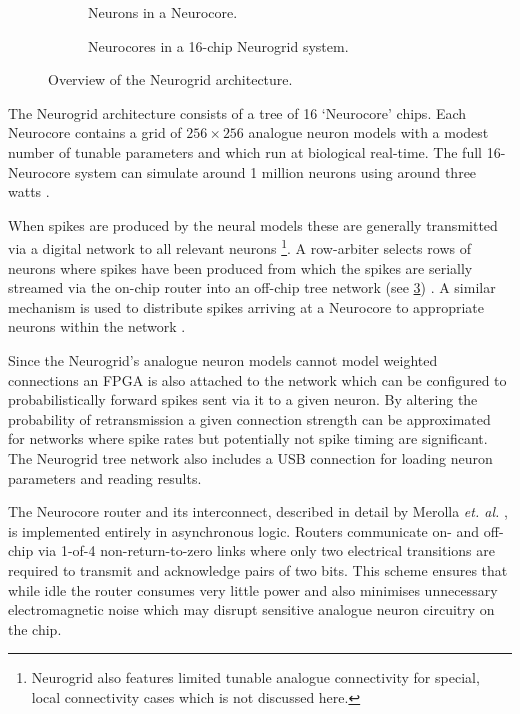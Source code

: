 				\begin{figure}
					\begin{subfigure}[b]{0.39\textwidth}
						\center
						
						\caption{Neurons in a Neurocore.}
						\label{fig:neurogrid-chip}
					\end{subfigure}
					\begin{subfigure}[b]{0.59\textwidth}
						\center
						
						\caption{Neurocores in a 16-chip Neurogrid system.}
						\label{fig:neurogrid-topology}
					\end{subfigure}
					
					\caption{Overview of the Neurogrid architecture.}
					\label{fig:neurogrid-arch-overview}
				\end{figure}
				
				The Neurogrid architecture consists of a tree of 16 `Neurocore' chips.
				Each Neurocore contains a grid of $256 \times 256$ analogue neuron
				models with a modest number of tunable parameters and which run at
				biological real-time. The full 16-Neurocore system can simulate around 1
				million neurons using around three watts \cite{benjamin14}.
				
				When spikes are produced by the neural models these are generally
				transmitted via a digital network to all relevant neurons
				\footnote{Neurogrid also features limited tunable analogue connectivity
				for special, local connectivity cases which is not discussed here.}. A
				row-arbiter selects rows of neurons where spikes have been produced from
				which the spikes are serially streamed via the on-chip router into an
				off-chip tree network (see \ref{fig:neurogrid-arch-overview})
				\cite{boahen04}. A similar mechanism is used to distribute spikes
				arriving at a Neurocore to appropriate neurons within the network
				\cite{boahen04receiver}.
				
				Since the Neurogrid's analogue neuron models cannot model weighted
				connections an FPGA is also attached to the network which can be
				configured to probabilistically forward spikes sent via it to a given
				neuron. By altering the probability of retransmission a given connection
				strength can be approximated for networks where spike rates but
				potentially not spike timing are significant.  The Neurogrid tree
				network also includes a USB connection for loading neuron parameters and
				reading results. 
				
				The Neurocore router and its interconnect, described in detail by
				Merolla \emph{et. al.} \cite{merolla14}, is implemented entirely in
				asynchronous logic. Routers communicate on- and off-chip via 1-of-4
				non-return-to-zero links where only two electrical transitions are
				required to transmit and acknowledge pairs of two bits. This scheme
				ensures that while idle the router consumes very little power and also
				minimises unnecessary electromagnetic noise which may disrupt sensitive
				analogue neuron circuitry on the chip.
				
